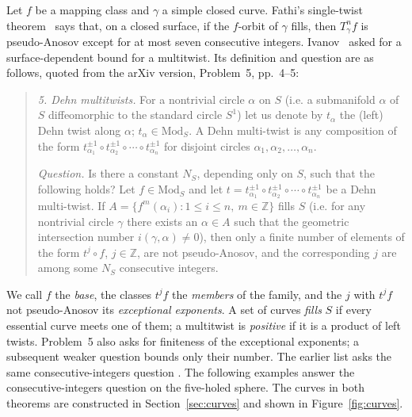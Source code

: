\documentclass[11pt]{article}
\theoremstyle{remark}
\begin{document}
Let $f$ be a mapping class and $\gamma$ a simple closed curve.
Fathi's single-twist theorem~\cite[Theorem~0.1]{Fathi} says that,
on a closed surface, if the $f$-orbit of $\gamma$ fills, then
$T_\gamma^n f$ is pseudo-Anosov except for at most seven consecutive
integers. Ivanov~\cite[Problem~5]{Ivanov06} asked for a
surface-dependent bound for a multitwist. Its definition and question
are as follows, quoted from the arXiv version, Problem~5, pp.~4--5:
\begin{quote}
\emph{5. Dehn multitwists.} For a nontrivial circle $\alpha$ on $S$ (i.e. a submanifold $\alpha$ of $S$ diffeomorphic to the standard circle $S^1$) let us denote by $t_\alpha$ the (left) Dehn twist along $\alpha$; $t_\alpha\in\mathrm{Mod}_S$. A Dehn multi-twist is any composition of the form $t_{\alpha_1}^{\pm1}\circ t_{\alpha_2}^{\pm1}\circ\cdots\circ t_{\alpha_n}^{\pm1}$ for disjoint circles $\alpha_1,\alpha_2,\ldots,\alpha_n$.

\emph{Question.} Is there a constant $N_S$, depending only on $S$, such that the following holds? Let $f\in\mathrm{Mod}_S$ and let $t=t_{\alpha_1}^{\pm1}\circ t_{\alpha_2}^{\pm1}\circ\cdots\circ t_{\alpha_n}^{\pm1}$ be a Dehn multi-twist. If $A=\{f^m(\alpha_i):1\le i\le n,\ m\in\mathbb{Z}\}$ fills $S$ (i.e. for any nontrivial circle $\gamma$ there exists an $\alpha\in A$ such that the geometric intersection number $i(\gamma,\alpha)\ne0$), then only a finite number of elements of the form $t^j\circ f$, $j\in\mathbb{Z}$, are not pseudo-Anosov, and the corresponding $j$ are among some $N_S$ consecutive integers.
\end{quote}
We call $f$ the \emph{base}, the classes $t^jf$ the \emph{members} of the
family, and the $j$ with $t^jf$ not pseudo-Anosov its \emph{exceptional
exponents}. A set of curves \emph{fills} $S$ if every essential curve
meets one of them; a multitwist is \emph{positive}
if it is a product of left twists.
Problem~5 also asks for finiteness of the exceptional exponents; a
subsequent weaker question bounds only their number. The earlier list asks
the same consecutive-integers question \cite[Problem~5]{Ivanov94}.
The following examples answer the consecutive-integers question on the
five-holed sphere. The curves in both theorems are constructed in
Section~\ref{sec:curves} and shown in Figure~\ref{fig:curves}.
\end{document}
